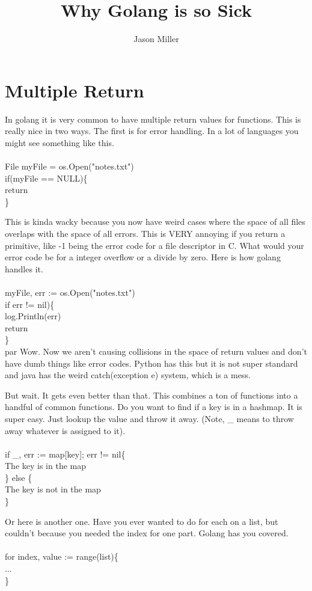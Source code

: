 \documentclass[12pt]{article}
\title{Why Golang is so Sick}
\author{Jason Miller}
\newcommand{\quest}[1]{\textcolor{dank}{#1}}
\newcommand{\ta}[0]{\hspace*{5mm}}
\begin{document}
\maketitle
\tableofcontents

\section{Multiple Return}
\par 
In golang it is very common to have multiple return values for functions. This is really nice in two ways. The first is for error handling. In a lot of languages you might see something like this. \\\\
\quest{
File myFile = os.Open("notes.txt")\\
if(myFile == NULL)\{\\
\ta return\\
 \}\\
}
\par 
This is kinda wacky because you now have weird cases where the space of all files overlaps with the space of all errors. This is VERY annoying if you return a primitive, like -1 being the error code for a file descriptor in C. What would your error code be for a integer overflow or a divide by zero. Here is how golang handles it. \\\\
\quest{
myFile, err := os.Open("notes.txt")\\
if err != nil)\{ \\
\ta log.Println(err)\\
\ta return\\
\}\\
}
par
Wow. Now we aren't causing collisions in the space of return values and don't have dumb things like error codes. Python has this but it is not super standard and java has the weird \quest{catch(exception e)} system, which is a mess. 
\par But wait. It gets even better than that. This combines a ton of functions into a  handful of common functions. Do you want to find if a key is in a hashmap. It is super easy. Just lookup the value and throw it away. (Note, \_ means to throw away whatever is assigned to it). \\\\
\quest{
if \_, err := map[key]; err != nil\{\\
\ta The key is in the map \\
\} else \{\\
\ta The key is not in the map\\
\}\\
}\par
Or here is another one. Have you ever wanted to do for each on a list, but couldn't because you needed the index for one part. Golang has you covered. \\\\
\quest{
for index, value := range(list)\{\\
\ta ...\\
\}\\
} 
\end{document}
